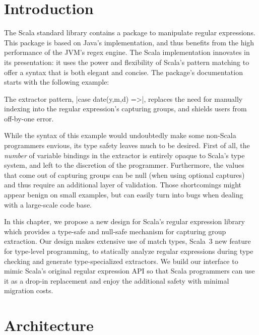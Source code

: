 \section{Introduction}

The Scala standard library contains a package to manipulate regular expressions.
This package is based on Java's implementation, and thus benefits from the high performance of the JVM's regex engine.
The Scala implementation innovates in its presentation: it uses the power and flexibility of Scala's pattern matching to offer a syntax that is both elegant and concise.
The package's documentation starts with the following example:

\regexDocumentation

\noindent
The extractor pattern, |case date(y,m,d) =>|, replaces the need for manually indexing into the regular expression's capturing groups, and shields users from off-by-one error.

While the syntax of this example would undoubtedly make some non-Scala programmers envious, its type safety leaves much to be desired.
First of all, the \emph{number} of variable bindings in the extractor is entirely opaque to Scala's type system, and left to the discretion of the programmer.
Furthermore, the values that come out of capturing groups can be null (when using optional captures) and thus require an additional layer of validation.
Those shortcomings might appear benign on small examples, but can easily turn into bugs when dealing with a large-scale code base.

In this chapter, we propose a new design for Scala's regular expression library which provides a type-safe and null-safe mechanism for capturing group extraction.
Our design makes extensive use of match types, Scala~3 new feature for type-level programming, to statically analyze regular expressions during type checking and generate type-specialized extractors.
We build our interface to mimic Scala's original regular expression API so that Scala programmers can use it as a drop-in replacement and enjoy the additional safety with minimal migration costs.

\section{Architecture}

